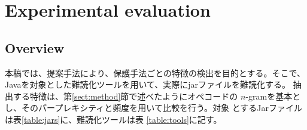 \documentclass[conference]{IEEEtran}
\newcommand{\birth}[1]{\mathcal{C}(#1)}
\begin{document}
% 
% 
% 
% 
% 
% 
% 
%

\section{Experimental evaluation}\label{sect:studies}
\subsection{Overview}


本稿では、提案手法により、保護手法ごとの特徴の検出を目的とする。そこで、
Javaを対象とした難読化ツールを用いて、実際にjarファイルを難読化する。
抽出する特徴は、第\ref{sect:method}節で述べたようにオペコードの
$n$-gramを基本とし、そのパープレキシティと頻度を用いて比較を行う。対象
とするJarファイルは表\ref{table:jars}に、難読化ツールは表
\ref{table:tools}に記す。
\end{document}
